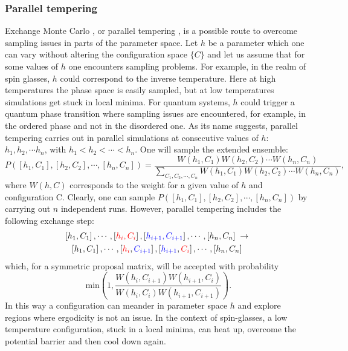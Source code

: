 \subsubsection{Parallel tempering } 
\label{Parallel_tempering.sec}
% 
Exchange Monte Carlo \cite{Hukushima96}, or parallel tempering \cite{Greyer91}, is a possible route to overcome sampling issues in parts of the parameter space.
Let $h$ be a parameter which one can vary without  altering the configuration space $ \{C  \}  $ and let us assume that for some values of $h$ one encounters sampling problems.   For example, in the realm of spin glasses, $h$  could correspond to the  inverse temperature.  Here at high temperatures the phase space is easily sampled, but at low temperatures  simulations get stuck in local minima. For quantum systems, $h$ could   trigger a quantum phase transition where  sampling issues are encountered, for example, in the ordered phase and not in the disordered one.   As its name suggests, parallel tempering  carries out in parallel simulations at consecutive  values of  $h$:  $h_1, h_2,  \cdots h_n$, with  $h_{1} < h_2 < \cdots < h_n$.  One will sample the extended ensemble:
\begin{equation}
	P(\left[h_1,C_1\right], \left[h_2,C_2\right], \cdots, \left[h_n,C_n\right] ) =  \frac{W(h_1,C_1) W(h_2,C_2) \cdots   W(h_n,C_n) } {\sum_{C_1, C_2, \cdots, C_n} W( h_1,C_1) W( h_2,C_2) \cdots   W(h_n,C_n) },
\end{equation}
where $W(h,C)$ corresponds to the weight for a given value of $h$ and configuration C. 
Clearly, one can sample  $P( \left[h_1,C_1\right], \left[h_2,C_2\right], \cdots, \left[h_n,C_n\right])$ by carrying out $n$ independent runs.
However, parallel tempering  includes the following   exchange step:
\begin{multline} \label{eq:exchangestep}
	\left[h_1,C_1\right], \cdots, \left[\textcolor{red}{h_i,C_i}\right],\left[\textcolor{blue}{h_{i+1},C_{i+1}}\right], \cdots, \left[h_n,C_n\right]  \; \rightarrow \\
	\left[h_1,C_1\right], \cdots, \left[\textcolor{red}{h_i},\textcolor{blue}{C_{i+1}}\right],\left[\textcolor{blue}{h_{i+1}},\textcolor{red}{C_{i}}\right], \cdots, \left[h_n,C_n\right]
\end{multline}
which, for a symmetric proposal matrix, will  be accepted with probability
\begin{equation}
	\text{ min} \left( 1,   \frac{ W(h_i,C_{i+1}) W(h_{i+1},C_{i})}{W(h_i,C_{i}) W(h_{i+1},C_{i+1})} \right).
\end{equation}
In this way a configuration can meander in parameter space $h$ and  explore regions where ergodicity is not an issue. In the context of spin-glasses, a low temperature configuration, stuck in a local minima, can heat up, overcome the potential  barrier and then cool down again. 
 
